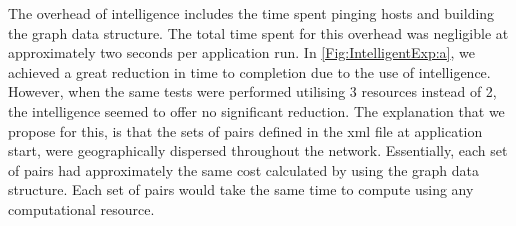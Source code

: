 \documentclass{rspublic}
\newcommand{\micnote}[1]{ {\textcolor{blue} { ***Michael: #1 }}}
\newcommand{\betynote}[1]{ {\textcolor{orange} { ***Bety: #1 }}}
\newcommand{\jhanote}[1]{} \newcommand{\micnote}[1]{}\newcommand{\betynote}[1]{} \newcommand{\fixme}[1]{}
\begin{document}
The overhead of intelligence includes the time spent pinging hosts and
building the graph data structure. The total time spent for this
overhead was negligible at approximately two seconds per application
run. In \ref{Fig:IntelligentExp:a}, we achieved a great reduction in
time to completion due to the use of intelligence.  However, when the
same tests were performed utilising 3 resources instead of 2, the
intelligence seemed to offer no significant reduction. The explanation
that we propose for this, is that the sets of pairs defined in
the xml file at application start, were geographically dispersed
throughout the network.  Essentially, each set of pairs had
approximately the same cost calculated by using the graph data
structure. Each set of pairs would take the same time to compute using
any computational resource.  \jhanote{Perhaps define a test to verify
this, so a note can go in saying we investigated this}
\end{document}
